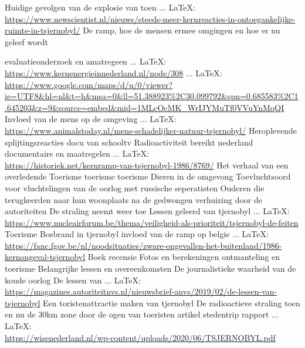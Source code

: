 \begin{thebibliography}{99}
{{{	Huidige gevolgen van de explosie van toen
	 ... \LaTeX:\\ \url{https://www.newscientist.nl/nieuws/steeds-meer-kernreacties-in-ontoegankelijke-ruimte-in-tsjernobyl/}
	De ramp, hoe de mensen ermee omgingen en hoe er nu geleef wordt
	
	evaluatieonderzoek en amatregeen
	 ... \LaTeX:\\ \url{https://www.kernenergieinnederland.nl/node/308}
	 ... \LaTeX:\\ \url{https://www.google.com/maps/d/u/0/viewer?ie=UTF8&hl=nl&t=h&msa=0&ll=51.388923%2C30.099792&spn=0.685583%2C1.645203&z=9&source=embed&mid=1MLcOcMK_WrIJYMuTf0VVuYnMqQI}
	Invloed van de mens op de omgeving
	 ... \LaTeX:\\ \url{https://www.animalstoday.nl/mens-schadelijker-natuur-tsjernobyl/}
	Heroplevende splijtingsreacties
	docu van schooltv
	Radioactiviteit bereikt nederland
	documentaire en maatregelen
	 ... \LaTeX:\\ \url{https://historiek.net/kernramp-van-tsjernobyl-1986/8769/}
	Het verhaal van een overledende
	Toerisme
	toerisme
	toerisme
	Dieren in de omgevong
	Toevluchtsoord voor vluchtelingen van de oorlog met russische seperatisten
	Ouderen die terugkeerden naar hun woonplaats na de gedwongen verhuizing door de autoriteiten
	De straling neemt weer toe
	Lessen geleerd van tjernobyl
	 ... \LaTeX:\\ \url{https://www.nucleairforum.be/thema/veiligheid-als-prioriteit/tsjernobyl-de-feiten}
	Toerisme
	Bosbrand in tjernobyl
	invloed van de ramp op belgie
	 ... \LaTeX:\\ \url{https://fanc.fgov.be/nl/noodsituaties/zware-ongevallen-het-buitenland/1986-kernongeval-tsjernobyl}
	Boek recensie
	Fotos en berekeningen
	ontmanteling en toerisme
	Belangrijke lessen en overeenkomsten
	De journalistieke waarheid van de koude oorlog
	De lessen van
	 ... \LaTeX:\\ \url{https://magazines.autoriteitnvs.nl/nieuwsbrief-anvs/2019/02/de-lessen-van-tsjernobyl}
	Een toristenattractie maken van tjernobyl
	De radioactieve straling toen en nu
	de 30km zone door de ogen van toeristen
	artikel
	stedentrip
	rapport
	 ... \LaTeX:\\ \url{https://wisenederland.nl/wp-content/uploads/2020/06/TSJERNOBYL.pdf}
}}}
\end{thebibliography}
